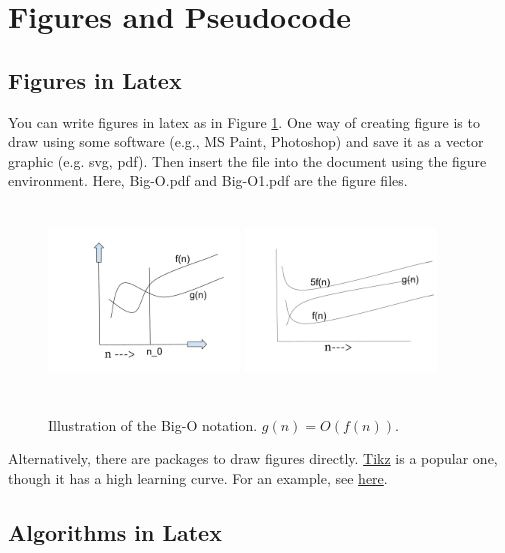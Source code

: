 \section{Figures and Pseudocode}

\subsection{Figures in Latex}

You can write figures in latex as in Figure \ref{fig:big-o}.
One way of creating figure is to draw using some software (e.g., MS Paint, Photoshop) and save it as a vector graphic (e.g. svg, pdf).
Then insert the file into the document using the figure environment. Here, Big-O.pdf and Big-O1.pdf are the figure files.
 
\begin{figure}
    \includegraphics*[width=2in,height=2in]{figures/Big-O}
    \includegraphics*[width=2in, height=2in]{figures/Big-O1}
    \caption{Illustration of the Big-O notation. $g(n) = O(f(n))$.}
    \label{fig:big-o}
\end{figure}

Alternatively, there are packages to draw figures directly. \href{https://tikz.dev/}{Tikz} is a popular one, though it has a high learning curve. For an example, see  \href{https://texample.net/tikz/examples/cycle/}{here}.



\subsection{Algorithms in Latex}

